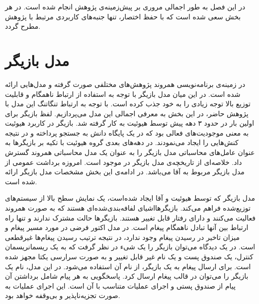 در این فصل به طور اجمالی مروری بر پیش‌زمینه‌ی پژوهش انجام شده است. در هر بخش سعی شده است که با حفظ اختصار، تنها جنبه‌های  کاربردی مرتبط با پژوهش مطرح گردد.
\section{مدل بازیگر}

در زمینه‌ی برنامه‌نویسی همروند پژوهش‌های مختلفی صورت گرفته و مدل‌هایی ارائه شده است\cite{Briot98concurrencyand}. در این میان مدل \gls{بازیگر} با توجه به استفاده از ارتباط ناهمگام و قابلیت توزیع بالا توجه زیادی را به خود جذب کرده است. با توجه به ارتباط تنگاتنگ این مدل با پژوهش حاضر، در این بخش به معرفی اجمالی این مدل می‌پردازیم.
لفظ بازیگر برای اولین بار در حدود ۳ دهه پیش توسط هیوئیت  \cite{Hewitt1972} به کار گرفته شد. بازیگر در کاربرد هیوئیت به معنی موجودیت‌های فعالی بود که در یک پایگاه دانش به جستجو پرداخته و در نتیجه کنش‌هایی را ایجاد می‌نمودند. در دهه‌های بعدی گروه هیوئیت با تکیه بر بازیگرها به عنوان عامل‌های محاسباتی مدل بازیگر را به عنوان یک مدل محاسباتی همروند گسترش داد. خلاصه‌ای از تاریخچه‌ی مدل بازیگر در \cite{AghaMST97} موجود است. امروزه برداشت عمومی از مدل بازیگر مربوط به  آقا\cite{Agha_86} می‌باشد. در ادامه‌ی این بخش مشخصات مدل بازیگر ارائه شده است.
 
مدل بازیگر که توسط هیوئیت و آقا \cite{Hewitt1972,Agha1987,Agha1990} ایجاد شده‌است، یک نمایش سطح بالا از سیستم‌های توزیع‌شده فراهم می‌کند. 
\gls{بازیگر}هااشیای \gls{لفافه‌بندی‌شده}‌ای هستند که به صورت \gls{همروند} فعالیت می‌کنند و دارای \gls{رفتار} قابل تغییر هستند. 
بازیگرها \gls{حالت  مشترک} ندارند و تنها راه ارتباط بین آنها تبادل ناهمگام پیغام است. 
 در مدل اکتور فرضی در مورد مسیر پیغام و میزان تاخیر در رسیدن پیغام وجود ندارد، در نتیجه ترتیب رسیدن پیغام‌ها \gls{غیرقطعی} است.
 در یک دیدگاه می‌توان بازیگر را یک \gls{شی‌ء} در نظر گرفت که به یک ریسمان\gls{ریسمان} کنترل، یک صندوق پست و یک نام غیر قابل تغییر و به صورت سرارسی یکتا  مجهز شده است. برای ارسال پیغام به یک بازیگر، از نام آن استفاده می‌شود. در این مدل، نام  یک بازیگر را می‌توان در قالب پیغام  ارسال کرد. پاسخگویی به هر پیام شامل برداشتن آن پیام از صندوق پستی و اجرای عملیات متناسب با آن است.
این اجرای عملیات به صورت \gls{تجزیه‌ناپذیر} و بی‌وقفه خواهد بود\cite{Agha_86}.

